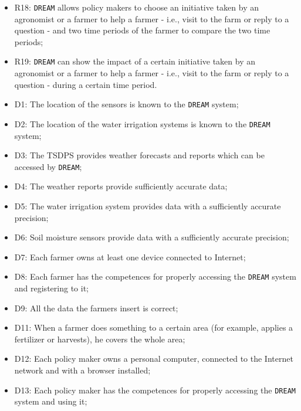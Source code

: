 \documentclass{article}
\begin{document}
\begin{itemize}
    \item R18: \verb|DREAM| allows policy makers to choose an initiative taken by an agronomist or a farmer to help a farmer - i.e., visit to the farm or reply to a question - and two time periods of the farmer to compare the two time periods;

    \item R19: \verb|DREAM| can show the impact of a certain initiative taken by an agronomist or a farmer to help a farmer - i.e., visit to the farm or reply to a question - during a certain time period.
    
    \item D1: The location of the sensors is known to the \verb|DREAM| system;
    
    \item D2: The location of the water irrigation systems is known to the \verb|DREAM| system;
    
    \item D3: The TSDPS provides weather forecasts and reports which can be accessed by \verb|DREAM|;
    
    \item D4: The weather reports provide sufficiently accurate data;
    
    \item D5: The water irrigation system provides data with a sufficiently accurate precision;
    
    \item D6: Soil moisture sensors provide data with a sufficiently accurate precision;
    
    \item D7: Each farmer owns at least one device connected to Internet;
    
    \item D8: Each farmer has the competences for properly accessing the \verb|DREAM| system and registering to it;
    
    \item D9: All the data the farmers insert is correct;
    
    \item D11: When a farmer does something to a certain area (for example, applies a fertilizer or harvests), he covers the whole area;
    
    \item D12: Each policy maker owns a personal computer, connected to the Internet network and with a browser installed;
    
    \item D13: Each policy maker has the competences for properly accessing the \verb|DREAM| system and using it;
    

\end{itemize}
\end{document}
